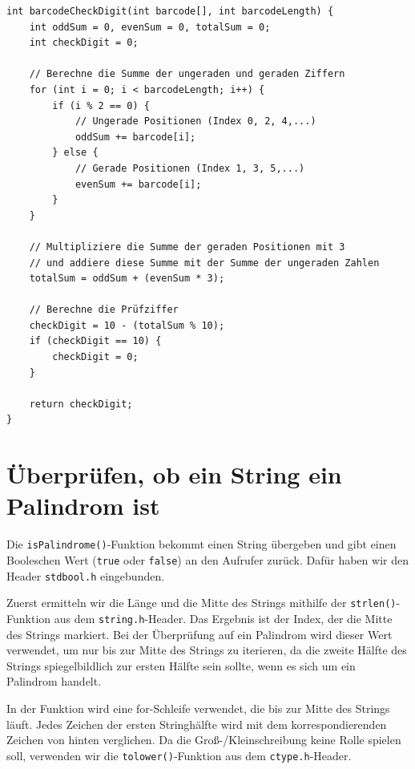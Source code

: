 \begin{verbatim}
int barcodeCheckDigit(int barcode[], int barcodeLength) {
    int oddSum = 0, evenSum = 0, totalSum = 0;
    int checkDigit = 0;

    // Berechne die Summe der ungeraden und geraden Ziffern
    for (int i = 0; i < barcodeLength; i++) {
        if (i % 2 == 0) {
            // Ungerade Positionen (Index 0, 2, 4,...)
            oddSum += barcode[i];
        } else {
            // Gerade Positionen (Index 1, 3, 5,...)
            evenSum += barcode[i];
        }
    }

    // Multipliziere die Summe der geraden Positionen mit 3
    // und addiere diese Summe mit der Summe der ungeraden Zahlen
    totalSum = oddSum + (evenSum * 3);

    // Berechne die Prüfziffer
    checkDigit = 10 - (totalSum % 10);
    if (checkDigit == 10) {
        checkDigit = 0;
    }

    return checkDigit;
}
\end{verbatim}










\chapter{Überprüfen, ob ein String ein Palindrom ist}

Die \texttt{isPalindrome()}-Funktion bekommt einen String übergeben und
gibt einen Booleschen Wert (\texttt{true} oder \texttt{false}) an
den Aufrufer zurück. Dafür haben wir den Header \texttt{stdbool.h}
eingebunden.

Zuerst ermitteln wir die Länge und die Mitte des Strings mithilfe der
\texttt{strlen()}-Funktion aus dem \texttt{string.h}-Header. Das
Ergebnis ist der Index, der die Mitte des Strings markiert. Bei der Überprüfung
auf ein Palindrom wird dieser Wert verwendet, um nur bis zur Mitte des Strings
zu iterieren, da die zweite Hälfte des Strings spiegelbildlich zur ersten Hälfte
sein sollte, wenn es sich um ein Palindrom handelt.

In der Funktion wird eine for-Schleife verwendet, die bis zur Mitte des Strings
läuft. Jedes Zeichen der ersten Stringhälfte wird mit dem korrespondierenden
Zeichen von hinten verglichen. Da die Groß-/Kleinschreibung keine Rolle spielen
soll, verwenden wir die \texttt{tolower()}-Funktion aus dem
\texttt{ctype.h}-Header.

